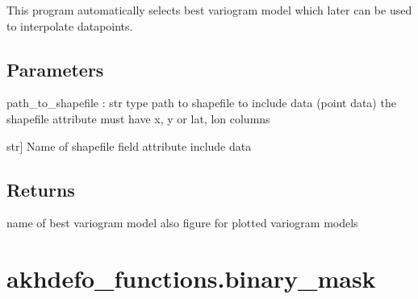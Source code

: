 \documentclass[letterpaper,10pt]{sphinxmanual}
\begin{document}
\begin{fulllineitems}
\label{\detokenize{generated/akhdefo_functions.Auto_Variogram:akhdefo_functions.Auto_Variogram}}
\pysigstartsignatures
{}
\pysigstopsignatures
\sphinxAtStartPar
This program automatically selects best variogram model which later 
can be used to interpolate datapoints.


\section{Parameters}
\label{\detokenize{generated/akhdefo_functions.Auto_Variogram:parameters}}
\sphinxAtStartPar
path\_to\_shapefile : str 
type path to shapefile to include data (point data)
the shapefile attribute must have x, y or lat, lon columns
\begin{description}
\sphinxlineitem{column\_attribute}{[}str{]}
\sphinxAtStartPar
Name of shapefile field attribute include data

\end{description}


\section{Returns}
\label{\detokenize{generated/akhdefo_functions.Auto_Variogram:returns}}\begin{description}
\sphinxAtStartPar
name of best variogram model
also figure for plotted variogram models

\end{description}

\end{fulllineitems}


\sphinxstepscope


\chapter{akhdefo\_functions.binary\_mask}
\label{\detokenize{generated/akhdefo_functions.binary_mask:akhdefo-functions-binary-mask}}\label{\detokenize{generated/akhdefo_functions.binary_mask::doc}}
\end{document}
